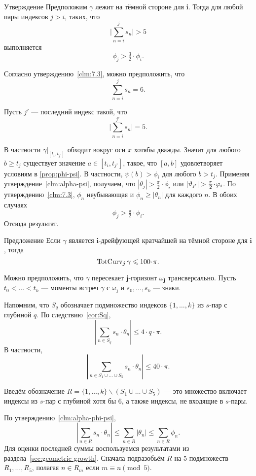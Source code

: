 \documentclass[a4paper,10pt]{article}
\begin{document}
\begin{thm}{Утверждение}\label{clm:geometric-grouth}
Предположим $\gamma$ лежит на тёмной стороне для $\bm{i}$.
Тогда для любой пары индексов $j>i$,
таких, что
\[\biggl|\sum_{n=i}^{j}s_n\biggr|> 5\]
выполняется
\[\phi_j>\tfrac32\cdot\phi_i.\]

\end{thm}


Согласно утверждению~\ref{clm:7.3}, можно предположить, что 
\[\sum_{n=i}^{j}s_n= 6.\]

Пусть $j'$ --- последний индекс такой, что
\[\biggl|\sum_{n=i}^{j'} s_n\biggr|=5.\]

В частности $\gamma|_{[t_i,t_{j'}]}$ обходит вокруг оси $x$ хотябы дважды.
Значит для любого $b\ge t_j$ существует значение $a\in[t_i,t_{j'}]$,
такое, что $[a,b]$ удовлетворяет условиям в \ref{prop:phi-psi}.
В частности, $\psi(b)>\phi_i$ для любого $b>t_j$.
Применяя утверждение~\ref{clm:alpha-psi},
получаем, что $|\theta_j|>\tfrac\pi2\cdot \phi_i$ или
$|\theta_{j'}|\zz>\tfrac\pi2\cdot \phi_i$.
По утверждению~\ref{clm:7.3}, $\phi_n$ неубывающая и $\phi_n\ge |\theta_n|$ для каждого $n$.
В обоих случаях
\[\phi_j>\tfrac\pi2\cdot \phi_i.\]
Отсюда результат.
\qeds



\begin{thm}{Предложение}\label{prop:graph}
Если $\gamma$ является $\bm{i}$-дрейфующей кратчайшей на тёмной стороне для $\bm{i}$, тогда
\[\tc_{\bm{j}}\gamma\le 100\cdot\pi.\]

\end{thm}

Можно предположить, что
$\gamma$ пересекает $\bm{j}$-горизонт $\omega_{\bm{j}}$ трансверсально.
Пусть $t_0<\dots<t_k$ --- моменты встреч $\gamma$ с $\omega_{\bm{j}}$ и
$s_0,\dots,s_k$ --- знаки.

Напомним, что $S_q$ обозначает подмножество индексов $\{1,\dots,k\}$ из $s$-пар с глубиной $q$.
По следствию~\ref{cor:Sq},
\[\left|\sum_{n\in S_q}s_n\cdot\theta_n\right|\le 4\cdot q\cdot \pi.\]
В частности,
\[\left|\sum_{n\in S_1\cup\dots\cup S_5}
s_n\cdot\theta_n\right|
\le 
40\cdot\pi.\]

Введём обозначение $R=\{1,\dots,k\}\backslash (S_1\cup\dots\cup S_5)$ ---
это множество включает индексы из $s$-пар с глубиной хотя бы $6$, 
а также индексы, не входящие в $s$-пары.

По утверждению~\ref{clm:alpha-phi-psi},
\[\left|\sum_{n\in R}
s_n\cdot\theta_n\right|
\le
\sum_{n\in R}
|\theta_n|\le \sum_{n\in R}\phi_n.\] 
Для оценки последней суммы воспользуемся результатами из раздела~\ref{sec:geometric-growth}.
Сначала подразобьём $R$ на 5 подмножеств $R_1,\dots,R_5$, 
полагая $n\in R_m$ если $m\equiv n\pmod 5$.
\end{document}
